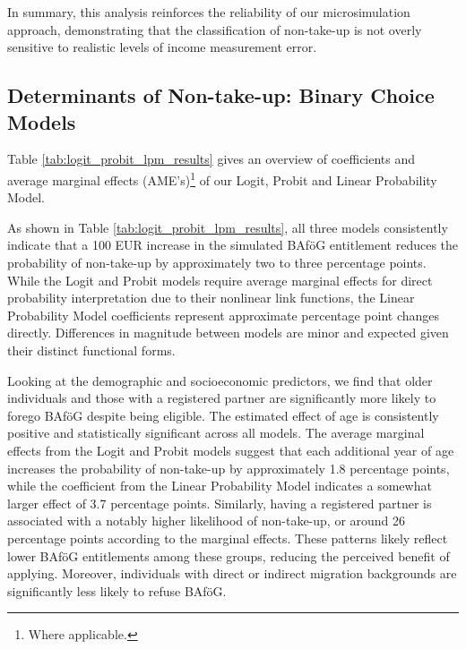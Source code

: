 In summary, this analysis reinforces the reliability of our microsimulation approach, demonstrating that the classification of non-take-up is not overly sensitive to realistic levels of income measurement error.



\subsection{Determinants of Non-take-up: Binary Choice Models}
Table \ref{tab:logit_probit_lpm_results} gives an overview of coefficients and average marginal effects (AME's)\footnote{Where applicable.} of our Logit, Probit and Linear Probability Model.


As shown in Table \ref{tab:logit_probit_lpm_results}, all three models consistently indicate that a 100 EUR increase in the simulated BAföG entitlement reduces the probability of non-take-up by approximately two to three percentage points. 
While the Logit and Probit models require average marginal effects for direct probability interpretation due to their nonlinear link functions, the Linear Probability Model coefficients represent approximate percentage point changes directly. 
Differences in magnitude between models are minor and expected given their distinct functional forms.



Looking at the demographic and socioeconomic predictors, we find that older individuals and those with a registered partner are significantly more likely to forego BAföG despite being eligible. 
The estimated effect of age is consistently positive and statistically significant across all models. 
The average marginal effects from the Logit and Probit models suggest that each additional year of age increases the probability of non-take-up by approximately 1.8 percentage points, while the coefficient from the Linear Probability Model indicates a somewhat larger effect of 3.7 percentage points. 
Similarly, having a registered partner is associated with a notably higher likelihood of non-take-up, or around 26 percentage points according to the marginal effects. 
These patterns likely reflect lower BAföG entitlements among these groups, reducing the perceived benefit of applying. Moreover, individuals with direct or indirect migration backgrounds are significantly less likely to refuse BAföG.


